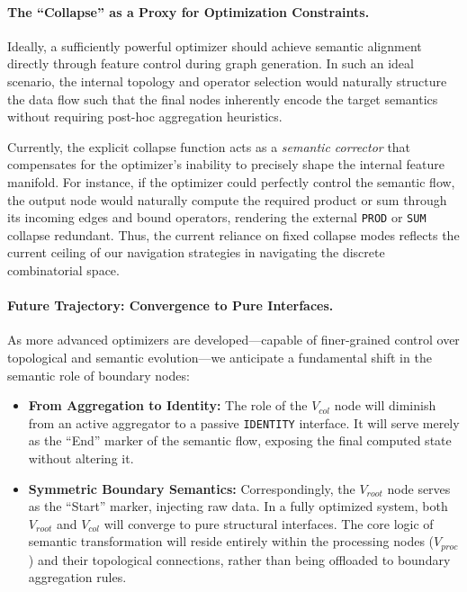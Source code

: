 \paragraph{The ``Collapse'' as a Proxy for Optimization Constraints.} 
Ideally, a sufficiently powerful optimizer should achieve semantic alignment directly through feature control during graph generation. In such an ideal scenario, the internal topology and operator selection would naturally structure the data flow such that the final nodes inherently encode the target semantics without requiring post-hoc aggregation heuristics. 

Currently, the explicit collapse function acts as a \textit{semantic corrector} that compensates for the optimizer's inability to precisely shape the internal feature manifold. For instance, if the optimizer could perfectly control the semantic flow, the output node would naturally compute the required product or sum through its incoming edges and bound operators, rendering the external \texttt{PROD} or \texttt{SUM} collapse redundant. Thus, the current reliance on fixed collapse modes reflects the current ceiling of our navigation strategies in navigating the discrete combinatorial space.

\paragraph{Future Trajectory: Convergence to Pure Interfaces.} 
As more advanced optimizers are developed---capable of finer-grained control over topological and semantic evolution---we anticipate a fundamental shift in the semantic role of boundary nodes:
\begin{itemize}
    \item \textbf{From Aggregation to Identity:} The role of the $V_{col}$ node will diminish from an active aggregator to a passive \texttt{IDENTITY} interface. It will serve merely as the ``End'' marker of the semantic flow, exposing the final computed state without altering it.
    \item \textbf{Symmetric Boundary Semantics:} Correspondingly, the $V_{root}$ node serves as the ``Start'' marker, injecting raw data. In a fully optimized system, both $V_{root}$ and $V_{col}$ will converge to pure structural interfaces. The core logic of semantic transformation will reside entirely within the processing nodes ($V_{proc}$) and their topological connections, rather than being offloaded to boundary aggregation rules.
\end{itemize}

